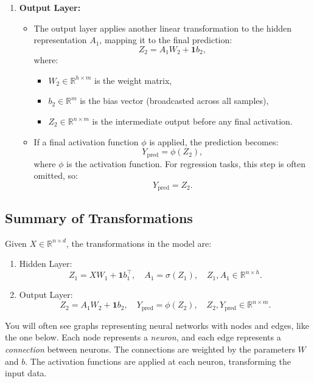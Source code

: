 \begin{enumerate}
    \item \textbf{Output Layer:}
    \begin{itemize}
        \item The output layer applies another linear transformation to the hidden representation \( A_1 \), mapping it to the final prediction:
        \[
        Z_2 = A_1 W_2 + \mathbf{1} b_2,
        \]
        where:
        \begin{itemize}
            \item \( W_2 \in \mathbb{R}^{h \times m} \) is the weight matrix,
            \item \( b_2 \in \mathbb{R}^{m} \) is the bias vector (broadcasted across all samples),
            \item \( Z_2 \in \mathbb{R}^{n \times m} \) is the intermediate output before any final activation.
        \end{itemize}
        \item If a final activation function \( \phi \) is applied, the prediction becomes:
        \[
        Y_{\text{pred}} = \phi(Z_2),
        \]
        where \( \phi \) is the activation function. For regression tasks, this step is often omitted, so:
        \[
        Y_{\text{pred}} = Z_2.
        \]
    \end{itemize}
\end{enumerate}

\subsection*{Summary of Transformations}

Given \( X \in \mathbb{R}^{n \times d} \), the transformations in the model are:
\begin{enumerate}
    \item Hidden Layer:
    \[
    Z_1 = X W_1 + \mathbf{1} b_1^\top, \quad A_1 = \sigma(Z_1), \quad Z_1, A_1 \in \mathbb{R}^{n \times h}.
    \]
    \item Output Layer:
    \[
    Z_2 = A_1 W_2 + \mathbf{1} b_2, \quad Y_{\text{pred}} = \phi(Z_2), \quad Z_2, Y_{\text{pred}} \in \mathbb{R}^{n \times m}.
    \]
\end{enumerate}

You will often see graphs representing neural networks with nodes and edges, like the one below. Each node represents a \emph{neuron}, and each edge represents a \emph{connection} between neurons. The connections are weighted by the parameters \( W \) and \( b \). The activation functions are applied at each neuron, transforming the input data.

